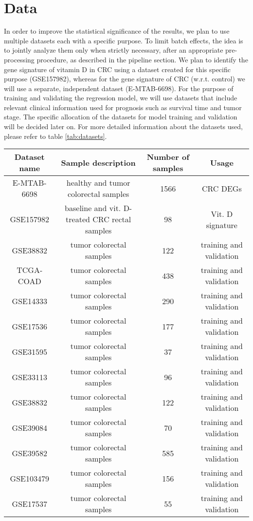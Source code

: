 \documentclass[fleqn,10pt]{SelfArx} %
\begin{document}
\section{Data}
In order to improve the statistical significance of the results, we plan to use multiple datasets each with a specific purpose. To limit batch effects, the idea is to jointly analyze them only when strictly necessary, after an appropriate pre-processing procedure, as described in the pipeline section. We plan to identify the gene signature of vitamin D in CRC using a dataset created for this specific purpose (GSE157982), whereas for the gene signature of CRC (w.r.t. control) we will use a separate, independent dataset (E-MTAB-6698). 
For the purpose of training and validating the regression model, we will use datasets that include relevant clinical information used for prognosis such as survival time and tumor stage. The specific allocation of the datasets for model training and validation will be decided later on. For more detailed information about the datasets used, please refer to table \ref{tab:datasets}.

\begin{table*}[ht]
	\centering
	\begin{tabular}{cccc}
		\hline
		Dataset name & Sample description & Number of samples & Usage \\
		\hline
		E-MTAB-6698	& healthy and tumor colorectal samples	&1566	&CRC DEGs\\
		GSE157982	&baseline and vit. D-treated CRC rectal samples	&98&	Vit. D signature\\
		GSE38832	&tumor colorectal samples	&122&	training and validation\\
		TCGA-COAD	&tumor colorectal samples	&438&	training and validation		\\
		GSE14333	&tumor colorectal samples	&290&	training and validation\\
		GSE17536	&tumor colorectal samples	&177&	training and validation	\\
		GSE31595	&tumor colorectal samples	&37	&training and validation	\\
		GSE33113	&tumor colorectal samples	&96	&training and validation	\\
		GSE38832	&tumor colorectal samples	&122&	training and validation	\\
		GSE39084	&tumor colorectal samples	&70	&training and validation	\\
		GSE39582	&tumor colorectal samples	&585&	training and validation	\\
		GSE103479	&tumor colorectal samples	&156&	training and validation	\\
		GSE17537	&tumor colorectal samples	&55	&training and validation	\\
		\hline
	\end{tabular}
	\caption{Datasets used}
	\label{tab:datasets}
\end{table*}
\end{document}
